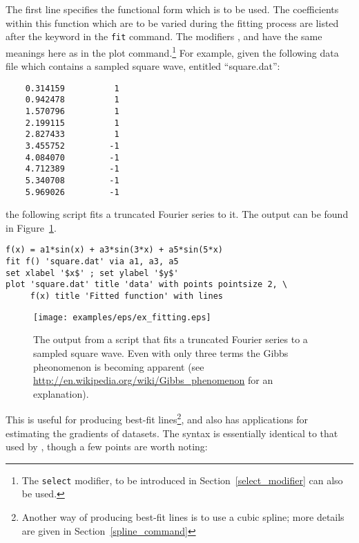 The first line specifies the functional form which is to be used.  The
coefficients within this function which are to be varied during the fitting
process are listed after the keyword  in the {\tt fit} command.
The modifiers ,  and
 have the same meanings here as in the plot
command.\footnote{The {\tt select} modifier, to be introduced in
Section~\ref{select_modifier} can also be used.}  For example, given the
following data file which contains a sampled square wave, entitled
``square.dat'':

\begin{verbatim}
    0.314159          1
    0.942478          1
    1.570796          1
    2.199115          1
    2.827433          1
    3.455752         -1
    4.084070         -1
    4.712389         -1
    5.340708         -1
    5.969026         -1
\end{verbatim}

\noindent the following script fits a truncated Fourier series to it.  The
output can be found in Figure~\ref{fig:ex_fitting}.

\begin{verbatim}
f(x) = a1*sin(x) + a3*sin(3*x) + a5*sin(5*x)
fit f() 'square.dat' via a1, a3, a5
set xlabel '$x$' ; set ylabel '$y$'
plot 'square.dat' title 'data' with points pointsize 2, \
     f(x) title 'Fitted function' with lines
\end{verbatim}

\begin{figure}
\begin{center}
\texttt{[image: examples/eps/ex\_fitting.eps]}
\end{center}
\caption{The output from a script that fits a truncated Fourier series to a
sampled square wave.  Even with only three terms the Gibbs pheonomenon is
becoming apparent (see \protect\url{http://en.wikipedia.org/wiki/Gibbs_phenomenon} for
an explanation).} 
\label{fig:ex_fitting}
\end{figure}


This is useful for producing best-fit lines\footnote{Another way of producing best-fit lines is to use a cubic
spline; more details are given in Section~\ref{spline_command}}, and also has
applications for estimating the gradients of datasets.  The syntax is
essentially identical to that used by \gnuplot, though a few points are worth
noting:

